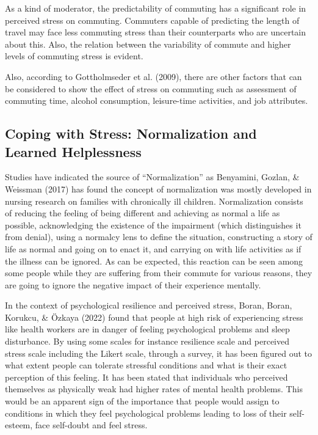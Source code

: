 \documentclass[
11pt, %
oneside, %
english, %
singlespacing, %
]{macthesis} %
\begin{document}
As a kind of moderator, the predictability of commuting has a significant role in perceived stress on commuting. Commuters capable of predicting the length of travel may face less commuting stress than their counterparts who are uncertain about this. Also, the relation between the variability of commute and higher levels of commuting stress is evident.

Also, according to Gottholmseder et al. (2009), there are other factors that can be considered to show the effect of stress on commuting such as assessment of commuting time, alcohol consumption, leisure-time activities, and job attributes.

\hypertarget{coping-with-stress-normalization-and-learned-helplessness}{%
\subsection{Coping with Stress: Normalization and Learned Helplessness}\label{coping-with-stress-normalization-and-learned-helplessness}}

Studies have indicated the source of ``Normalization'' as Benyamini, Gozlan, \& Weissman (2017) has found the concept of normalization was mostly developed in nursing research on families with chronically ill children. Normalization consists of reducing the feeling of being different and achieving as normal a life as possible, acknowledging the existence of the impairment (which distinguishes it from denial), using a normalcy lens to define the situation, constructing a story of life as normal and going on to enact it, and carrying on with life activities as if the illness can be ignored. As can be expected, this reaction can be seen among some people while they are suffering from their commute for various reasons, they are going to ignore the negative impact of their experience mentally.

In the context of psychological resilience and perceived stress, Boran, Boran, Korukcu, \& Özkaya (2022) found that people at high risk of experiencing stress like health workers are in danger of feeling psychological problems and sleep disturbance. By using some scales for instance resilience scale and perceived stress scale including the Likert scale, through a survey, it has been figured out to what extent people can tolerate stressful conditions and what is their exact perception of this feeling. It has been stated that individuals who perceived themselves as physically weak had higher rates of mental health problems. This would be an apparent sign of the importance that people would assign to conditions in which they feel psychological problems leading to loss of their self-esteem, face self-doubt and feel stress.
\end{document}
